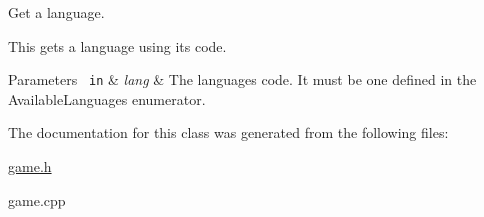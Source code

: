 Get a language. 

This gets a language using its code.


\begin{DoxyParams}[1]{Parameters}
\mbox{\texttt{ in}}  & {\em lang} & The language\textquotesingle{}s code. It must be one defined in the Available\+Languages enumerator. \\
\hline
\end{DoxyParams}


The documentation for this class was generated from the following files\+:\begin{DoxyCompactItemize}
\item 
\mbox{\hyperlink{game_8h}{game.\+h}}\item 
game.\+cpp\end{DoxyCompactItemize}
